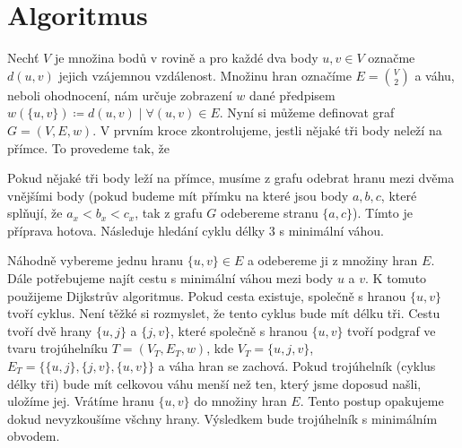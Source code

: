 \section{Algoritmus}
\label{sec:algoritmus}

Nechť $V$ je množina bodů v rovině a pro každé dva body $u, v \in V$ označme $d(u, v)$ jejich vzájemnou vzdálenost. Množinu hran označíme $E = \binom{V}{2}$ a váhu, neboli ohodnocení, nám určuje zobrazení $w$ dané předpisem $w(\{u, v\}) \coloneqq d(u, v)\mid \forall (u, v) \in E$. Nyní si můžeme definovat graf $G = (V, E, w)$. V prvním kroce zkontrolujeme, jestli nějaké tři body neleží na přímce. To provedeme tak, že 

Pokud nějaké tři body leží na přímce, musíme z grafu odebrat hranu mezi dvěma vnějšími body (pokud budeme mít přímku na které jsou body $a, b, c$, které splňují, že $a_x < b_x < c_x$, tak z grafu $G$ odebereme stranu $\{a, c\}$).
Tímto je příprava hotova. Následuje hledání cyklu délky 3 s minimální váhou.

Náhodně vybereme jednu hranu $\{u, v\} \in E$ a odebereme ji z množiny hran $E$. Dále potřebujeme najít cestu s minimální váhou mezi body $u$ a  $v$. K tomuto použijeme Dijkstrův algoritmus. Pokud cesta existuje, společně s hranou $\{u, v\}$ tvoří cyklus. Není těžké si rozmyslet, že tento cyklus bude mít délku tři. Cestu tvoří dvě hrany $\{u, j\}$ a $\{j, v\}$, které společně s hranou $\{u, v\}$ tvoří podgraf ve tvaru trojúhelníku $T = (V_T, E_T, w)$, kde $V_T = \{u, j, v\}$, $E_T = \{\{u,j\}, \{j,v\}, \{u,v\}\}$ a váha hran se zachová. Pokud trojúhelník (cyklus délky tři) bude mít celkovou váhu menší než ten, který jsme doposud našli, uložíme jej.
Vrátíme hranu $\{u, v\}$ do množiny hran $E$. Tento postup opakujeme dokud nevyzkoušíme všchny hrany. Výsledkem bude trojúhelník s minimálním obvodem.


